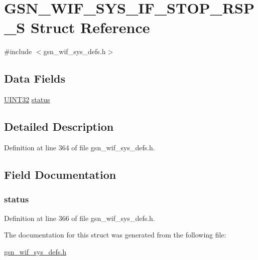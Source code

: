 \hypertarget{a00356}{
\section{GSN\_\-WIF\_\-SYS\_\-IF\_\-STOP\_\-RSP\_\-S Struct Reference}
\label{a00356}
}


{\ttfamily \#include $<$gsn\_\-wif\_\-sys\_\-defs.h$>$}

\subsection*{Data Fields}
\begin{DoxyCompactItemize}
\item 
\hyperlink{a00660_gae1e6edbbc26d6fbc71a90190d0266018}{UINT32} \hyperlink{a00356_ac6b7193d1fe7063cf448ef96398230d8}{status}
\end{DoxyCompactItemize}


\subsection{Detailed Description}


Definition at line 364 of file gsn\_\-wif\_\-sys\_\-defs.h.



\subsection{Field Documentation}
\hypertarget{a00356_ac6b7193d1fe7063cf448ef96398230d8}{
\subsubsection[{status}]{ {\bf status}}}
\label{a00356_ac6b7193d1fe7063cf448ef96398230d8}


Definition at line 366 of file gsn\_\-wif\_\-sys\_\-defs.h.



The documentation for this struct was generated from the following file:\begin{DoxyCompactItemize}
\item 
\hyperlink{a00612}{gsn\_\-wif\_\-sys\_\-defs.h}\end{DoxyCompactItemize}
